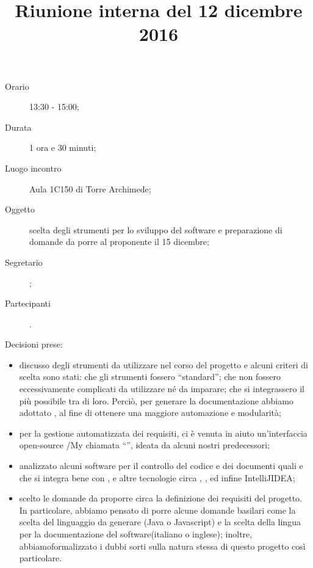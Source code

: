


\author{\PB}
\supervisor{\MM}
\title{Riunione interna del 12 dicembre 2016}



\maketitle

\begin{description}
	\item[Orario] 13:30 - 15:00;
	\item[Durata] 1 ora e 30 minuti;
	\item[Luogo incontro] Aula 1C150 di Torre Archimede;
	\item[Oggetto] scelta degli strumenti per lo sviluppo del software e preparazione di domande da porre al proponente il 15 dicembre;
	\item[Segretario] \PB; 
	\item[Partecipanti] \ALL.
\end{description}

Decisioni prese:
\begin{itemize}
\item discusso degli strumenti da utilizzare nel corso del progetto e alcuni criteri di scelta sono stati: che gli strumenti fossero “standard”; che non fossero eccessivamente complicati da utilizzare né da imparare; che si integrassero il più possibile tra di loro. Perciò, per generare la documentazione abbiamo adottato , al fine di ottenere una maggiore automazione e modularità;
\item per la gestione automatizzata dei requisiti, ci è venuta in aiuto un'interfaccia open-source /My chiamata “”, ideata da alcuni nostri predecessori;
\item analizzato alcuni software per il controllo del codice e dei documenti quali  e  che si integra bene con , e altre tecnologie circa , ,  ed infine IntelliJIDEA;
\item scelto le domande da proporre circa la definizione dei requisiti del progetto. In particolare, abbiamo pensato di porre alcune domande basilari come la scelta del linguaggio da generare (Java o Javascript) e la scelta della lingua per la documentazione del software(italiano o inglese); inoltre, abbiamoformalizzato i dubbi sorti sulla natura stessa di questo progetto così particolare.
\end{itemize}


